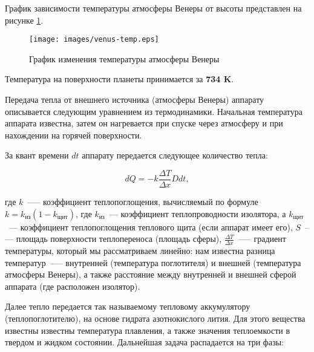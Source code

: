\documentclass[12pt,a4paper]{article}
\begin{document}
График зависимости температуры атмосферы Венеры от высоты представлен на рисунке
\ref{Pic:venus_temp}.

\begin{figure}[tbh]
  \begin{center}
    \texttt{[image: images/venus-temp.eps]}
    \caption{График изменения температуры атмосферы Венеры}
    \label{Pic:venus_temp}
  \end{center}
\end{figure}

Температура на поверхности планеты принимается за \textbf{734 K}.

Передача тепла от внешнего источника (атмосферы Венеры) аппарату описывается следующим
уравнением из термодинамики. Начальная температура аппарата известна, затем он нагревается
при спуске через атмосферу и при нахождении на горячей поверхности.

За квант времени $dt$ аппарату передается следующее количество тепла:

$$
dQ = -k \frac{\Delta T}{\Delta x} D dt,
$$

где $k$~--— коэффициент теплопоглощения, вычисляемый по формуле $k = k_{\text{из}} (1 -
k_{\text{щит}})$, где $k_{\text{из}}$~--- коэффициент теплопроводности изолятора, а
$k_{\text{щит}}$~--- коэффициент теплопоглощения теплового щита (если аппарат имеет его),
$S$~--— площадь поверхности теплопереноса (площадь сферы), $\frac{\Delta T}{\Delta x}$~--—
градиент температуры, который мы рассматриваем линейно: нам известна разница
температур~--— внутренней (температура поглотителя) и внешней (температура атмосферы
Венеры), а также расстояние между внутренней и внешней сферой аппарата (где расположен
изолятор).

Далее тепло передается так называемому тепловому аккумулятору (теплопоглотителю), на
основе гидрата азотнокислого лития. Для этого вещества известны известны температура
плавления, а также значения теплоемкости в твердом и жидком состоянии. Дальнейшая задача
распадается на три фазы:
\end{document}
